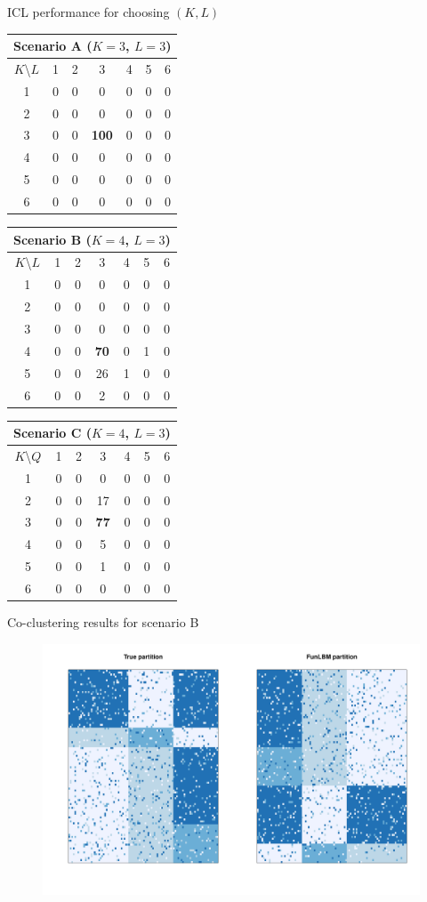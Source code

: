 \documentclass[10pt]{beamer}
\begin{document}
\begin{frame}{ICL performance for choosing $(K,L)$}
\begin{table}
\begin{tabular}{|c|c|c|c|c|c|c|}
\hline 
\multicolumn{7}{|c|}{Scenario A ($K=3$, $L=3$)}\tabularnewline
\hline 
$K$\textbackslash{}$L$ & 1 & 2 & 3 & 4 & 5 & 6\tabularnewline
\hline 
1 & 0 & 0 & 0 & 0 & 0 & 0\tabularnewline
\hline 
2 & 0 & 0 & 0 & 0 & 0 & 0\tabularnewline
\hline 
3 & 0 & 0 & \textbf{100} & 0 & 0 & 0\tabularnewline
\hline 
4 & 0 & 0 & 0 & 0 & 0 & 0\tabularnewline
\hline 
5 & 0 & 0 & 0 & 0 & 0 & 0\tabularnewline
\hline 
6 & 0 & 0 & 0 & 0 & 0 & 0\tabularnewline
\hline 
\end{tabular}
\begin{tabular}{|c|c|c|c|c|c|c|}
\hline 
\multicolumn{7}{|c|}{Scenario B ($K=4$, $L=3$)}\tabularnewline
\hline 
$K$\textbackslash{}$L$ & 1 & 2 & 3 & 4 & 5 & 6\tabularnewline
\hline 
1 & 0 & 0 & 0 & 0 & 0 & 0\tabularnewline
\hline 
2 & 0 & 0 & 0 & 0 & 0 & 0\tabularnewline
\hline 
3 & 0 & 0 & 0 & 0 & 0 & 0\tabularnewline
\hline 
4 & 0 & 0 & \textbf{70} & 0 & 1 & 0\tabularnewline
\hline 
5 & 0 & 0 & 26 & 1 & 0 & 0\tabularnewline
\hline 
6 & 0 & 0 & 2 & 0 & 0 & 0\tabularnewline
\hline 
\end{tabular}
\begin{tabular}{|c|c|c|c|c|c|c|}
\hline 
\multicolumn{7}{|c|}{Scenario C ($K=4$, $L=3$)}\tabularnewline
\hline 
$K$\textbackslash{}$Q$ & 1 & 2 & 3 & 4 & 5 & 6\tabularnewline
\hline 
1 & 0 & 0 & 0 & 0 & 0 & 0\tabularnewline
\hline 
2 & 0 & 0 & 17 & 0 & 0 & 0\tabularnewline
\hline 
3 & 0 & 0 & \textbf{77} & 0 & 0 & 0\tabularnewline
\hline 
4 & 0 & 0 & 5 & 0 & 0 & 0\tabularnewline
\hline 
5 & 0 & 0 & 1 & 0 & 0 & 0\tabularnewline
\hline 
6 & 0 & 0 & 0 & 0 & 0 & 0\tabularnewline
\hline
\end{tabular}
\end{table}
\end{frame}

\begin{frame}{Co-clustering results for scenario B}
\begin{figure}
\begin{centering}
\includegraphics[width=0.9\columnwidth]{images/Fig-Simu-clustering2}
\par\end{centering}
\end{figure}
\end{frame}
\end{document}
